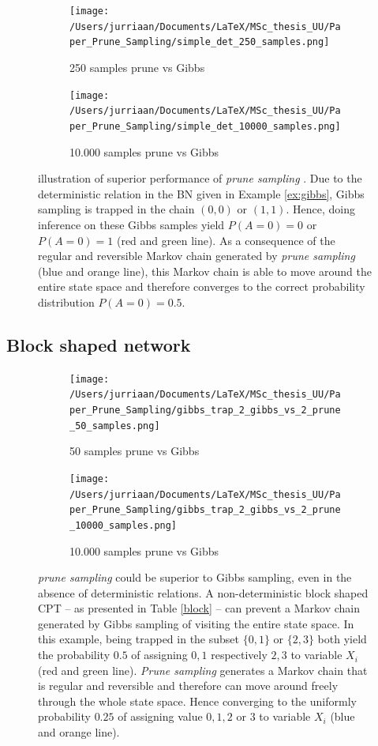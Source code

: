 \documentclass[a4paper, twoside, 11pt]{report}
\theoremstyle{plain}
\theoremstyle{definition}
\theoremstyle{remark}
\newcommand{\ps}{\textit{prune sampling }}
\begin{document}
\begin{figure}[h]
\centering
\begin{subfigure}{.49\textwidth}
  \centering
  \texttt{[image: /Users/jurriaan/Documents/LaTeX/MSc\_thesis\_UU/Paper\_Prune\_Sampling/simple\_det\_250\_samples.png]}
  \caption{250 samples prune vs Gibbs}
  \label{fig:sub1}
\end{subfigure}
\begin{subfigure}{.49\textwidth}
  \centering
  \texttt{[image: /Users/jurriaan/Documents/LaTeX/MSc\_thesis\_UU/Paper\_Prune\_Sampling/simple\_det\_10000\_samples.png]}
  \caption{10.000 samples prune vs Gibbs}
  \label{fig:sub2}
\end{subfigure}
\caption{illustration of superior performance of \ps. Due to the deterministic relation in the BN given in Example \ref{ex:gibbs}, Gibbs sampling is trapped in the chain $(0,0)$ or $(1,1)$. Hence, doing inference on these Gibbs samples yield $P(A = 0)=0$ or $P(A = 0)=1$ (red and green line). As a consequence of the regular and reversible Markov chain generated by \ps (blue and orange line), this Markov chain is able to move around the entire state space and therefore converges to the correct probability distribution $P(A = 0) = 0.5$.}
\label{simple-deterministic}
\end{figure}

\newpage
\subsection{Block shaped network}

\begin{figure}[h]
\centering
\begin{subfigure}{.49\textwidth}
  \centering
  \texttt{[image: /Users/jurriaan/Documents/LaTeX/MSc\_thesis\_UU/Paper\_Prune\_Sampling/gibbs\_trap\_2\_gibbs\_vs\_2\_prune\_50\_samples.png]}
  \caption{50 samples prune vs Gibbs}
  \label{fig:sub1}
\end{subfigure}
\begin{subfigure}{.49\textwidth}
  \centering
  \texttt{[image: /Users/jurriaan/Documents/LaTeX/MSc\_thesis\_UU/Paper\_Prune\_Sampling/gibbs\_trap\_2\_gibbs\_vs\_2\_prune\_10000\_samples.png]}
  \caption{10.000 samples prune vs Gibbs}
  \label{fig:sub2}
\end{subfigure}
\vspace{0.75pc}
\caption{\ps could be superior to Gibbs sampling, even in the absence of deterministic relations. A non-deterministic block shaped CPT -- as presented in Table \ref{block} -- can prevent a Markov chain generated by Gibbs sampling of visiting the entire state space. In this example, being trapped in the subset $\{0, 1\}$ or $\{2, 3\}$ both yield the probability $0.5$ of assigning $0,1$ respectively $2,3$ to variable $X_i$ (red and green line). \textit{Prune sampling} generates a Markov chain that is regular and reversible and therefore can move around freely through the whole state space. Hence converging to the uniformly probability $0.25$ of assigning value $0,1,2$ or $3$ to variable $X_i$ (blue and orange line).} 
\label{block-BN}
\end{figure}
\end{document}
